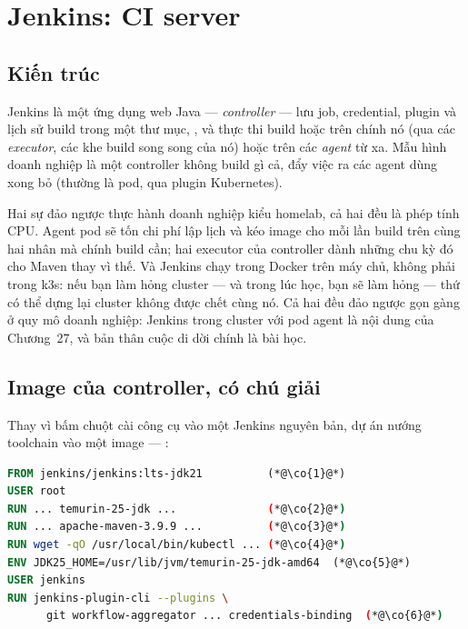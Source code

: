 \chapter{Jenkins: CI server}
\label{ch:jenkins}

\section{Kiến trúc}

Jenkins là một ứng dụng web Java --- \emph{controller} --- lưu job,
credential, plugin và lịch sử build trong một thư mục,
, và thực thi build hoặc trên chính nó (qua các
\emph{executor}, các khe build song song của nó) hoặc trên các
\emph{agent} từ xa. Mẫu hình doanh nghiệp là một controller không
build gì cả, đẩy việc ra các agent dùng xong bỏ (thường là pod, qua
plugin Kubernetes).

\begin{decision}
Hai sự đảo ngược thực hành doanh nghiệp kiểu homelab, cả hai đều là
phép tính CPU. Agent pod sẽ tốn chi phí lập lịch và kéo image cho mỗi
lần build trên cùng hai nhân mà chính build cần; hai executor của
controller dành những chu kỳ đó cho Maven thay vì thế. Và Jenkins chạy
trong Docker trên máy chủ, không phải trong k3s: nếu bạn làm hỏng
cluster --- và trong lúc học, bạn sẽ làm hỏng --- thứ có thể dựng lại
cluster không được chết cùng nó. Cả hai đều đảo ngược gọn gàng ở quy
mô doanh nghiệp: Jenkins trong cluster với pod agent là nội dung của
Chương~27, và bản thân cuộc di dời chính là bài học.
\end{decision}

\section{Image của controller, có chú giải}

Thay vì bấm chuột cài công cụ vào một Jenkins nguyên bản, dự án nướng
toolchain vào một image --- :

\begin{lstlisting}[language=dockerfile]
FROM jenkins/jenkins:lts-jdk21          (*@\co{1}@*)
USER root
RUN ... temurin-25-jdk ...              (*@\co{2}@*)
RUN ... apache-maven-3.9.9 ...          (*@\co{3}@*)
RUN wget -qO /usr/local/bin/kubectl ... (*@\co{4}@*)
ENV JDK25_HOME=/usr/lib/jvm/temurin-25-jdk-amd64  (*@\co{5}@*)
USER jenkins
RUN jenkins-plugin-cli --plugins \
      git workflow-aggregator ... credentials-binding  (*@\co{6}@*)
\end{lstlisting}

